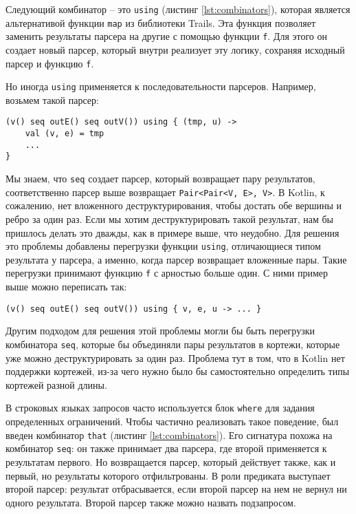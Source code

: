 Следующий комбинатор -- это \verb|using| (листинг \ref{lst:combinators}), которая является альтернативой функции \texttt{map} из библиотеки Trails. Эта функция позволяет заменить результаты парсера на другие с помощью функции \verb|f|.
Для этого он создает новый парсер, который внутри реализует эту логику, сохраняя исходный парсер и функцию \verb|f|.

Но иногда \verb|using| применяется к последовательности парсеров.
Например, возьмем такой парсер:

\begin{nobreaks}
    \begin{lstlisting}
(v() seq outE() seq outV()) using { (tmp, u) -> 
    val (v, e) = tmp
    ... 
}
\end{lstlisting}
\end{nobreaks}

Мы знаем, что \verb|seq| создает парсер, который возвращает пару результатов, соответственно парсер выше возвращает \verb|Pair<Pair<V, E>, V>|.
В Kotlin, к сожалению, нет вложенного деструктурирования, чтобы достать обе вершины и ребро за один раз.
Если мы хотим деструктурировать такой результат, нам бы пришлось делать это дважды, как в примере выше, что неудобно.
Для решения это проблемы добавлены перегрузки функции \verb|using|, отличающиеся типом результата у парсера, а именно, когда парсер возвращает вложенные пары. Такие перегрузки принимают функцию \verb|f| с арностью больше один. С ними пример выше можно переписать так:
\begin{lstlisting}
(v() seq outE() seq outV()) using { v, e, u -> ... }
\end{lstlisting}

Другим подходом для решения этой проблемы могли бы быть перегрузки комбинатора \verb|seq|, которые бы объединяли пары результатов в кортежи, которые уже можно деструктурировать за один раз. Проблема тут в том, что в Kotlin нет поддержки кортежей, из-за чего нужно было бы самостоятельно определить типы кортежей разной длины.

В строковых языках запросов часто используется блок \texttt{where} для задания определенных ограничений. Чтобы частично реализовать такое поведение, был введен комбинатор \texttt{that} (листинг \ref{lst:combinators}). Его сигнатура похожа на комбинатор \texttt{seq}: он также принимает два парсера, где второй применяется к результатам первого. Но возвращается парсер, который действует также, как и первый, но результаты которого отфильтрованы. В роли предиката выступает второй парсер: результат отбрасывается, если второй парсер на нем не вернул ни одного результата. Второй парсер также можно назвать подзапросом.


